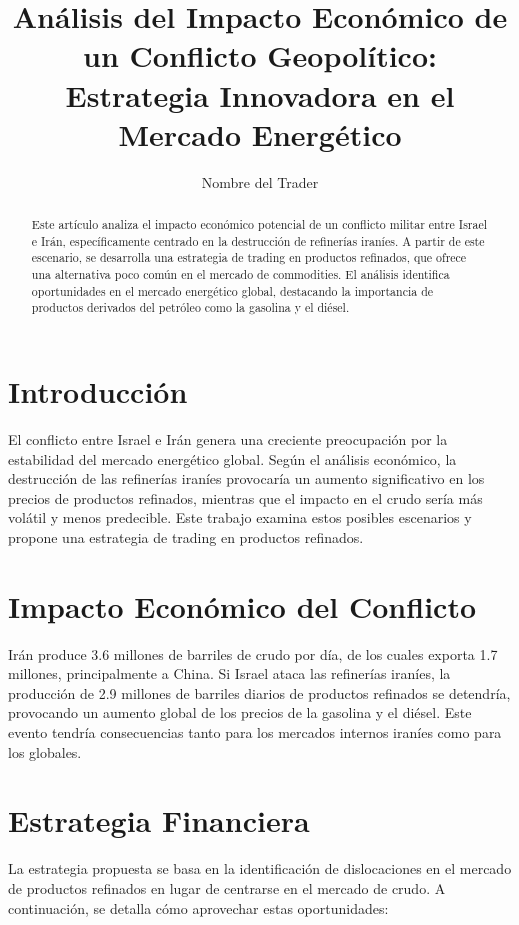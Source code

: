 \documentclass[12pt]{article}
\title{Análisis del Impacto Económico de un Conflicto Geopolítico: \\ Estrategia Innovadora en el Mercado Energético}
\author{Nombre del Trader}
\begin{document}
\maketitle

\begin{abstract}
Este artículo analiza el impacto económico potencial de un conflicto militar entre Israel e Irán, específicamente centrado en la destrucción de refinerías iraníes. A partir de este escenario, se desarrolla una estrategia de trading en productos refinados, que ofrece una alternativa poco común en el mercado de commodities. El análisis identifica oportunidades en el mercado energético global, destacando la importancia de productos derivados del petróleo como la gasolina y el diésel.
\end{abstract}

\section{Introducción}
El conflicto entre Israel e Irán genera una creciente preocupación por la estabilidad del mercado energético global. Según el análisis económico, la destrucción de las refinerías iraníes provocaría un aumento significativo en los precios de productos refinados, mientras que el impacto en el crudo sería más volátil y menos predecible. Este trabajo examina estos posibles escenarios y propone una estrategia de trading en productos refinados.

\section{Impacto Económico del Conflicto}
Irán produce 3.6 millones de barriles de crudo por día, de los cuales exporta 1.7 millones, principalmente a China. Si Israel ataca las refinerías iraníes, la producción de 2.9 millones de barriles diarios de productos refinados se detendría, provocando un aumento global de los precios de la gasolina y el diésel. Este evento tendría consecuencias tanto para los mercados internos iraníes como para los globales.

\section{Estrategia Financiera}
La estrategia propuesta se basa en la identificación de dislocaciones en el mercado de productos refinados en lugar de centrarse en el mercado de crudo. A continuación, se detalla cómo aprovechar estas oportunidades:
\end{document}
